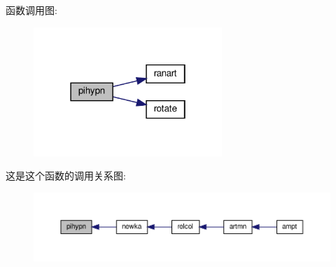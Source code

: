 函数调用图\+:
\nopagebreak
\begin{figure}[H]
\begin{center}
\leavevmode
\includegraphics[width=202pt]{pihypn_8f90_ab94d6dcca38149f15f71a65c8a8afcd3_cgraph}
\end{center}
\end{figure}
这是这个函数的调用关系图\+:
\nopagebreak
\begin{figure}[H]
\begin{center}
\leavevmode
\includegraphics[width=350pt]{pihypn_8f90_ab94d6dcca38149f15f71a65c8a8afcd3_icgraph}
\end{center}
\end{figure}
